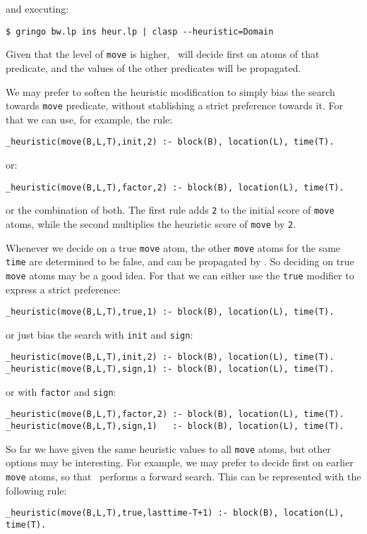 and executing:
\begin{verbatim}
$ gringo bw.lp ins heur.lp | clasp --heuristic=Domain \end{verbatim}

Given that the level of \texttt{move} is higher,  \clasp\ will decide first on atoms of that predicate,  
and the values of the other predicates will be propagated. 

We may prefer to soften the heuristic modification to simply bias the search  towards \texttt{move} predicate, 
without stablishing a strict preference towards it.  For that we can use, for example, the rule: 
\begin{verbatim}
_heuristic(move(B,L,T),init,2) :- block(B), location(L), time(T).\end{verbatim} or: 
\begin{verbatim}
_heuristic(move(B,L,T),factor,2) :- block(B), location(L), time(T).\end{verbatim}

or the combination of both.  The first rule adds \texttt{2} to the initial score of \texttt{move} atoms,  
while the second multiplies the heuristic score of \texttt{move} by \texttt{2}.  

Whenever we decide on a true \texttt{move} atom,  the other \texttt{move} atoms for the same \texttt{time} are determined to be false,  
and can be propagated by \clasp. So deciding on true \texttt{move} atoms may be a good idea. 
For that we can either use the \texttt{true} modifier to express a strict preference: 
\begin{verbatim}
_heuristic(move(B,L,T),true,1) :- block(B), location(L), time(T).\end{verbatim}

or just bias the search with \texttt{init} and \texttt{sign}:
\begin{verbatim}
_heuristic(move(B,L,T),init,2) :- block(B), location(L), time(T).
_heuristic(move(B,L,T),sign,1) :- block(B), location(L), time(T).\end{verbatim}

or with \texttt{factor} and \texttt{sign}:
\begin{verbatim}
_heuristic(move(B,L,T),factor,2) :- block(B), location(L), time(T).
_heuristic(move(B,L,T),sign,1)   :- block(B), location(L), time(T).\end{verbatim}



So far we have given the same heuristic values to all \texttt{move} atoms, 
but other options may be interesting. For example, we may prefer to decide first on earlier \texttt{move} atoms,  
so that \clasp\ performs a forward search. This can be represented with the following rule:
\begin{verbatim}
_heuristic(move(B,L,T),true,lasttime-T+1) :- block(B), location(L), time(T).\end{verbatim}

